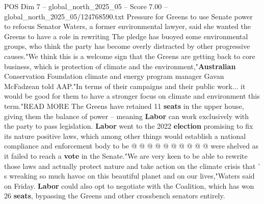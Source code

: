 \begin{textsample}{POS Dim 7 – global\_north\_2025\_05 – Score 7.00 – global\_north\_2025\_05/124768590.txt}
Pressure for Greens to use Senate power to refocus Senator Waters, a former environmental lawyer, said she wanted the Greens to have a role in rewriting The pledge has buoyed some environmental groups, who think the party has become overly distracted by other progressive causes."We think this is a welcome sign that the Greens are getting back to core business, which is protection of climate and the environment,"\textbf{Australian} Conservation Foundation climate and energy program manager Gavan McFadzean told AAP."In terms of their campaigns and their public work... it would be good for them to have a stronger focus on climate and environment this term."READ MORE The Greens have retained 11 \textbf{seats} in the upper house, giving them the balance of power -- meaning \textbf{Labor} can work exclusively with the party to pass legislation. \textbf{Labor} went to the 2022 \textbf{election} promising to fix its nature positive laws, which among other things would establish a national compliance and enforcement body to be @ @ @ @ @ @ @ @ @ @ were shelved as it failed to reach a \textbf{vote} in the Senate."We are very keen to be able to rewrite those laws and actually protect nature and take action on the climate crisis that ' s wreaking so much havoc on this beautiful planet and on our lives,"Waters said on Friday. \textbf{Labor} could also opt to negotiate with the Coalition, which has won 26 \textbf{seats}, bypassing the Greens and other crossbench senators entirely.

\end{textsample}
